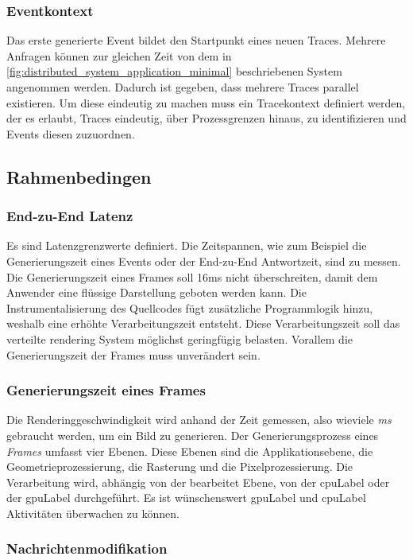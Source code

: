 \subsubsection{Eventkontext}
\label{subsubsection:Eventkontext}
Das erste generierte Event bildet den Startpunkt eines neuen Traces. Mehrere Anfragen können zur gleichen Zeit von dem in \cref{fig:distributed_system_application_minimal} beschriebenen System angenommen werden. Dadurch ist gegeben, dass mehrere Traces parallel existieren. Um diese eindeutig zu machen muss ein Tracekontext definiert werden, der es erlaubt, Traces eindeutig, über Prozessgrenzen hinaus, zu identifizieren und Events diesen zuzuordnen.

\subsection{Rahmenbedingen}
\label{subsection:Rahmenbedingen}
\subsubsection{End-zu-End Latenz}
\label{subsubsection:end-zu-end Latenz}
Es sind Latenzgrenzwerte definiert. Die Zeitspannen, wie zum Beispiel die Generierungszeit eines Events oder der End-zu-End Antwortzeit, sind zu messen. Die Generierungszeit eines Frames soll 16ms nicht überschreiten, damit dem Anwender eine flüssige Darstellung geboten werden kann. Die Instrumentalisierung des Quellcodes fügt zusätzliche Programmlogik hinzu, weshalb eine erhöhte Verarbeitungszeit entsteht. Diese Verarbeitungszeit soll das verteilte rendering System möglichst geringfügig belasten. Vorallem die Generierungszeit der Frames muss unverändert sein.

\subsubsection{Generierungszeit eines Frames}
\label{subsubsection:Generierungszeit eines Frames}
Die Renderinggeschwindigkeit wird anhand der Zeit gemessen, also wieviele \emph{ms} gebraucht werden, um ein Bild zu generieren. Der Generierungsprozess eines \emph{Frames} umfasst vier Ebenen. Diese Ebenen sind die Applikationsebene, die Geometrieprozessierung, die Rasterung und die Pixelprozessierung. Die Verarbeitung wird, abhängig von der bearbeitet Ebene, von der \gls{cpuLabel} oder der \gls{gpuLabel} durchgeführt. Es ist wünschenswert \gls{gpuLabel} und \gls{cpuLabel} Aktivitäten überwachen zu können.

\subsubsection{Nachrichtenmodifikation}
\label{subsubsection:Nachrichtenmodifikation}

